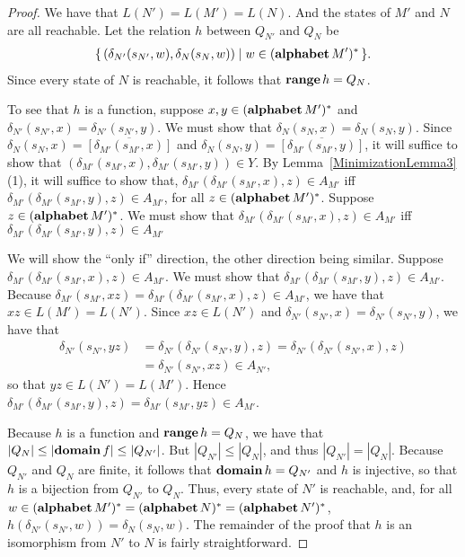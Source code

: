 \begin{proof}
We have that $L(N')=L(M')=L(N)$.  And the states of $M'$ and $N$ are
all reachable.  Let the relation $h$ between $Q_{N'}$ and $Q_N$ be
\begin{gather*}
  \{ \, (\delta_{N'}(s_{N'},w),\delta_N(s_N,w)) \mid w\in(\mathbf{alphabet}\,M')^* \, \}
  .
\end{gather*}
Since every state of $N$ is reachable, it follows that $\mathbf{range}\,h=
Q_N$.

To see that $h$ is a function, suppose $x,y\in(\mathbf{alphabet}\,M')^*$ and
$\delta_{N'}(s_{N'},x)=\delta_{N'}(s_{N'},y)$.  We must show that
$\delta_N(s_N,x)=\delta_N(s_N,y)$.  Since
$\delta_N(s_N,x)=\overline{[\delta_{M'}(s_{M'},x)]}$ and
$\delta_N(s_N,y)=\overline{[\delta_{M'}(s_{M'},y)]}$, it will suffice
to show that $(\delta_{M'}(s_{M'},x),\delta_{M'}(s_{M'},y))\in Y$.  By
Lemma~\ref{MinimizationLemma3}(1), it will suffice to show that,
$\delta_{M'}(\delta_{M'}(s_{M'},x), z)\in A_{M'}$ iff
$\delta_{M'}(\delta_{M'}(s_{M'},y), z)\in A_{M'}$, for all
$z\in(\mathbf{alphabet}\,M')^*$.  Suppose $z\in(\mathbf{alphabet}\,M')^*$.  We must
show that $\delta_{M'}(\delta_{M'}(s_{M'},x), z)\in A_{M'}$ iff
$\delta_{M'}(\delta_{M'}(s_{M'},y), z)\in A_{M'}$

We will show the ``only if'' direction, the other direction being
similar.  Suppose $\delta_{M'}(\delta_{M'}(s_{M'},x), z)\in A_{M'}$.
We must show that $\delta_{M'}(\delta_{M'}(s_{M'},y), z)\in A_{M'}$.
Because $\delta_{M'}(s_{M'},xz) = \delta_{M'}(\delta_{M'}(s_{M'},x),
z)\in A_{M'}$, we have that $xz\in L(M')=L(N')$.  Since $xz\in L(N')$
and $\delta_{N'}(s_{N'},x)=\delta_{N'}(s_{N'},y)$, we have that
\begin{align*}
  \delta_{N'}(s_{N'},yz) &= \delta_{N'}(\delta_{N'}(s_{N'},y), z) =
  \delta_{N'}(\delta_{N'}(s_{N'},x), z)\\
  &= \delta_{N'}(s_{N'},xz) \in A_{N'} ,
\end{align*}
so that $yz\in L(N')=L(M')$.  Hence
$\delta_{M'}(\delta_{M'}(s_{M'},y), z) = \delta_{M'}(s_{M'},yz) \in
A_{M'}$.

Because $h$ is a function and $\mathbf{range}\,h=Q_N$, we have that
$|Q_N|\leq |\mathbf{domain}\,f|\leq |Q_{N'}|$. But $|Q_{N'}|\leq |Q_N|$, and thus
$|Q_{N'}| = |Q_N|$. Because $Q_{N'}$ and $Q_N$ are finite, it
follows that $\mathbf{domain}\,h = Q_{N'}$ and $h$ is injective, so that $h$
is a bijection from $Q_{N'}$ to $Q_N$.  Thus, every state of $N'$ is
reachable, and, for all
$w\in(\mathbf{alphabet}\,M')^* = (\mathbf{alphabet}\,N)^* = (\mathbf{alphabet}\,N')^*$,
$h(\delta_{N'}(s_{N'},w))=\delta_N(s_N,w)$.  The remainder of the
proof that $h$ is an isomorphism from $N'$ to $N$ is fairly
straightforward.
\end{proof}

